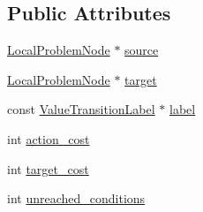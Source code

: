 \subsection*{Public Attributes}
\begin{DoxyCompactItemize}
\item 
\hyperlink{structcea__heuristic_1_1LocalProblemNode}{Local\-Problem\-Node} $\ast$ \hyperlink{structcea__heuristic_1_1LocalTransition_aaba912a6833b1e67b4ea87b8bd0b29a7}{source}
\item 
\hyperlink{structcea__heuristic_1_1LocalProblemNode}{Local\-Problem\-Node} $\ast$ \hyperlink{structcea__heuristic_1_1LocalTransition_afcf4ec907c471d5dd78227af3126064c}{target}
\item 
const \hyperlink{structValueTransitionLabel}{Value\-Transition\-Label} $\ast$ \hyperlink{structcea__heuristic_1_1LocalTransition_aab850b464f65d75549475703ecfc4b71}{label}
\item 
int \hyperlink{structcea__heuristic_1_1LocalTransition_ac9bd7cfc8b7a1da642364191324d848e}{action\-\_\-cost}
\item 
int \hyperlink{structcea__heuristic_1_1LocalTransition_aeb7ee7a8f8eb15bf991fa0a15da7df47}{target\-\_\-cost}
\item 
int \hyperlink{structcea__heuristic_1_1LocalTransition_a1cfc683bfa5c7fd391edfdc4da647e83}{unreached\-\_\-conditions}
\end{DoxyCompactItemize}


